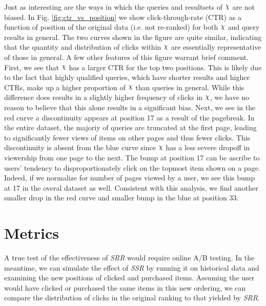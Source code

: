 \documentclass{article}
\def\Chi{\raisebox{2pt}{$\chi$}}
\begin{document}
Just as interesting are the ways in which the queries and resultsets of $\Chi$
are not biased. In Fig. \ref{fig:ctr_vs_position} we show click-through-rate
(CTR) as a function of position of the original data (i.e. not re-ranked) for
both $\Chi$ and query results in general. The two curves shown in the figure are
quite similar, indicating that the quantity and distribution of clicks within
$\Chi$ are essentially representative of those in general. A few other features
of this figure warrant brief comment. First, we see that $\Chi$ has a larger CTR
for the top two positions. This is likely due to the fact that highly qualified
queries, which have shorter results and higher CTRs,  make up a higher
proportion of $\Chi$ than queries in general. While this difference does results
in a slightly higher frequency of clicks in $\Chi$, we have no reason to believe
that this alone results in a significant bias. Next, we see in the red curve a
discontinuity appears at position 17 as a result of the pagebreak. In the entire
dataset, the majoriy of queries are truncated at the first page, leading to
significantly fewer views of items on other pages and thus fewer clicks. This
discontinuity is absent from the blue curve since $\Chi$ has a less severe
dropoff in viewership from one page to the next.  The bump at position 17 can be
ascribe to users' tendency to disproportionately click on the topmost item shown
on a page. Indeed, if we normalize for number of pages viewed by a user, we see
this bump at 17 in the overal dataset as well. Consistent with this analysis, we
find another smaller drop in the red curve and smaller bump in the blue at
position 33.

\section{Metrics}

A true test of the effectiveness of {\em SRR} would require online A/B
testing. In the meantime, we can simulate the effect of {\em SSR} by running it
on historical data and examining the new positions of clicked and purchased items.
Assuming the user would have clicked or purchased the same items in this new ordering, 
we can compare the distribution of clicks in the original ranking to that yielded 
by {\em SRR}.
\end{document}
